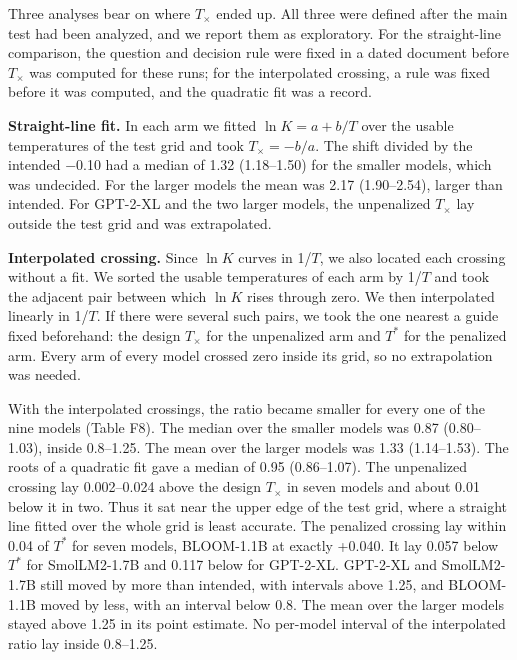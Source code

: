 \documentclass[aps,prx,onecolumn,superscriptaddress,longbibliography]{revtex4-2}
\begin{document}
Three analyses bear on where \(T_{\times}\) ended up. All three were defined after the main test had been analyzed, and we report them as exploratory. For the straight-line comparison, the question and decision rule were fixed in a dated document before \(T_{\times}\) was computed for these runs; for the interpolated crossing, a rule was fixed before it was computed, and the quadratic fit was a record.

\textbf{Straight-line fit.} In each arm we fitted \(\ln K=a+b/T\) over the usable temperatures of the test grid and took \(T_\times=-b/a\). The shift divided by the intended −0.10 had a median of 1.32 (1.18--1.50) for the smaller models, which was undecided. For the larger models the mean was 2.17 (1.90--2.54), larger than intended. For GPT-2-XL and the two larger models, the unpenalized \(T_{\times}\) lay outside the test grid and was extrapolated.

\textbf{Interpolated crossing.} Since \(\ln K\) curves in 1/\(T\), we also located each crossing without a fit. We sorted the usable temperatures of each arm by 1/\(T\) and took the adjacent pair between which \(\ln K\) rises through zero. We then interpolated linearly in 1/\(T\). If there were several such pairs, we took the one nearest a guide fixed beforehand: the design \(T_{\times}\) for the unpenalized arm and \(T^*\) for the penalized arm. Every arm of every model crossed zero inside its grid, so no extrapolation was needed.

With the interpolated crossings, the ratio became smaller for every one of the nine models (Table F8). The median over the smaller models was 0.87 (0.80--1.03), inside 0.8--1.25. The mean over the larger models was 1.33 (1.14--1.53). The roots of a quadratic fit gave a median of 0.95 (0.86--1.07). The unpenalized crossing lay 0.002--0.024 above the design \(T_{\times}\) in seven models and about 0.01 below it in two. Thus it sat near the upper edge of the test grid, where a straight line fitted over the whole grid is least accurate. The penalized crossing lay within 0.04 of \(T^*\) for seven models, BLOOM-1.1B at exactly +0.040. It lay 0.057 below \(T^*\) for SmolLM2-1.7B and 0.117 below for GPT-2-XL. GPT-2-XL and SmolLM2-1.7B still moved by more than intended, with intervals above 1.25, and BLOOM-1.1B moved by less, with an interval below 0.8. The mean over the larger models stayed above 1.25 in its point estimate. No per-model interval of the interpolated ratio lay inside 0.8--1.25.
\end{document}
